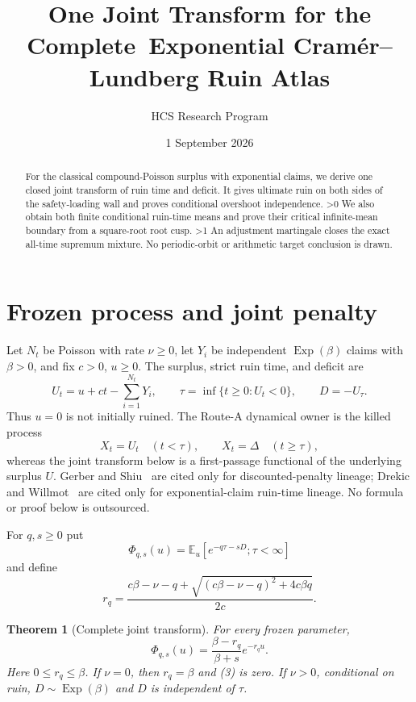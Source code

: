 \documentclass[10pt]{article}
\title{One Joint Transform for the Complete\
Exponential Cram\'er--Lundberg Ruin Atlas}
\author{HCS Research Program}
\date{1 September 2026}
\providecommand{\CRevisionRound}{2}
\newtheorem{theorem}{Theorem}
\newcommand{\E}{\mathbb E}
\begin{document}
\maketitle

\begin{abstract}
For the classical compound-Poisson surplus with exponential claims, we derive
one closed joint transform of ruin time and deficit.  It gives ultimate ruin
on both sides of the safety-loading wall and proves conditional overshoot
independence.
\ifnum\CRevisionRound>0
We also obtain both finite conditional ruin-time means and prove their
critical infinite-mean boundary from a square-root root cusp.
\fi
\ifnum\CRevisionRound>1
An adjustment martingale closes the exact all-time supremum mixture.
\fi
No periodic-orbit or arithmetic target conclusion is drawn.
\end{abstract}

\section{Frozen process and joint penalty}
Let $N_t$ be Poisson with rate $\nu\geq0$, let $Y_i$ be independent
$\operatorname{Exp}(\beta)$ claims with $\beta>0$, and fix $c>0$, $u\geq0$.
The surplus, strict ruin time, and deficit are
\begin{equation}
 U_t=u+ct-\sum_{i=1}^{N_t}Y_i,\qquad
\tau=\inf\{t\geq0:U_t<0\},\qquad D=-U_\tau. \tag{1}
\end{equation}
Thus $u=0$ is not initially ruined.  The Route-A dynamical owner is the
killed process
\[
 X_t=U_t\quad(t<\tau),\qquad X_t=\Delta\quad(t\geq\tau),
\]
whereas the joint transform below is a first-passage functional of the
underlying surplus $U$.  Gerber and Shiu~\cite{GerberShiu1998}
are cited only for discounted-penalty lineage; Drekic and
Willmot~\cite{DrekicWillmot2003} are cited only for exponential-claim
ruin-time lineage.  No formula or proof below is outsourced.

For $q,s\geq0$ put
\[
 \Phi_{q,s}(u)=\E_u[e^{-q\tau-sD};\tau<\infty]
\]
and define
\begin{equation}
 r_q=\frac{c\beta-\nu-q+
 \sqrt{(c\beta-\nu-q)^2+4c\beta q}}{2c}. \tag{2}
\end{equation}

\begin{theorem}[Complete joint transform]
For every frozen parameter,
\begin{equation}
 \boxed{\displaystyle
 \Phi_{q,s}(u)=\frac{\beta-r_q}{\beta+s}e^{-r_qu}.} \tag{3}
\end{equation}
Here $0\leq r_q\leq\beta$.  If $\nu=0$, then $r_q=\beta$ and (3) is zero.
If $\nu>0$, conditional on ruin,
$D\sim\operatorname{Exp}(\beta)$ and $D$ is independent of $\tau$.
\end{theorem}
\end{document}
